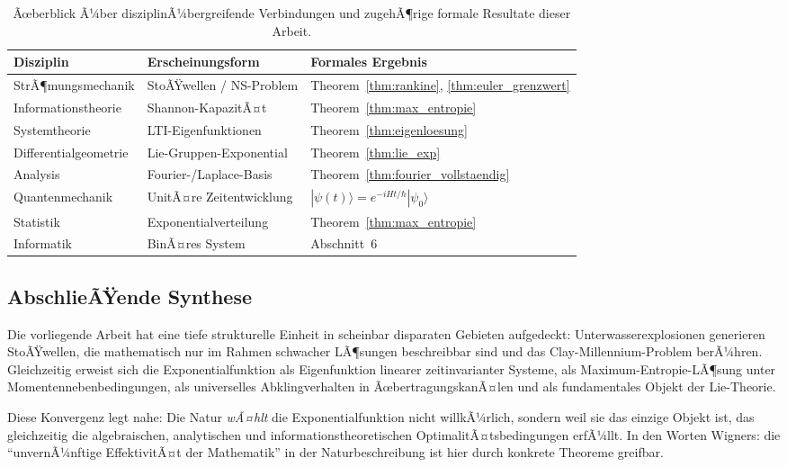 ﻿\documentclass[12pt,a4paper]{article}
\theoremstyle{definition}
\theoremstyle{remark}
\begin{document}
\begin{table}[H]
\centering
\begin{tabular}{@{}lll@{}}
\toprule
\textbf{Disziplin} & \textbf{Erscheinungsform} & \textbf{Formales Ergebnis} \\
\midrule
StrÃ¶mungsmechanik & StoÃŸwellen / NS-Problem & Theorem~\ref{thm:rankine}, \ref{thm:euler_grenzwert} \\
Informationstheorie & Shannon-KapazitÃ¤t & Theorem~\ref{thm:max_entropie} \\
Systemtheorie & LTI-Eigenfunktionen & Theorem~\ref{thm:eigenloesung} \\
Differentialgeometrie & Lie-Gruppen-Exponential & Theorem~\ref{thm:lie_exp} \\
Analysis & Fourier-/Laplace-Basis & Theorem~\ref{thm:fourier_vollstaendig} \\
Quantenmechanik & UnitÃ¤re Zeitentwicklung & $|\psi(t)\rangle = e^{-iHt/\hbar}|\psi_0\rangle$ \\
Statistik & Exponentialverteilung & Theorem~\ref{thm:max_entropie} \\
Informatik & BinÃ¤res System & Abschnitt~6 \\
\bottomrule
\end{tabular}
\caption{Ãœberblick Ã¼ber disziplinÃ¼bergreifende Verbindungen und zugehÃ¶rige formale Resultate dieser Arbeit.}
\end{table}

\subsection{AbschlieÃŸende Synthese}

Die vorliegende Arbeit hat eine tiefe strukturelle Einheit in scheinbar disparaten Gebieten aufgedeckt: Unterwasserexplosionen generieren StoÃŸwellen, die mathematisch nur im Rahmen schwacher LÃ¶sungen beschreibbar sind und das Clay-Millennium-Problem berÃ¼hren. Gleichzeitig erweist sich die Exponentialfunktion als Eigenfunktion linearer zeitinvarianter Systeme, als Maximum-Entropie-LÃ¶sung unter Momentennebenbedingungen, als universelles Abklingverhalten in ÃœbertragungskanÃ¤len und als fundamentales Objekt der Lie-Theorie.

Diese Konvergenz legt nahe: Die Natur \emph{wÃ¤hlt} die Exponentialfunktion nicht willkÃ¼rlich, sondern weil sie das einzige Objekt ist, das gleichzeitig die algebraischen, analytischen und informationstheoretischen OptimalitÃ¤tsbedingungen erfÃ¼llt. In den Worten Wigners: die ``unvernÃ¼nftige EffektivitÃ¤t der Mathematik'' in der Naturbeschreibung ist hier durch konkrete Theoreme greifbar.
\end{document}
